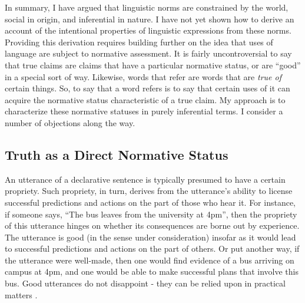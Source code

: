 In summary, I have argued that linguistic norms are constrained by the world, social in origin, and inferential in nature. I have not yet shown how to derive an account of the intentional properties of linguistic expressions from these norms. Providing this derivation requires building further on the idea that uses of language are subject to normative assessment. It is fairly uncontroversial to say that true claims are claims that have a particular normative status, or are ``good'' in a special sort of way. Likewise, words that refer are words that are \textit{true of} certain things. So, to say that a word refers is to say that certain uses of it can acquire the normative status characteristic of a true claim. My approach is to characterize these normative statuses in purely inferential terms. I consider a number of objections along the way. 
 
\subsection{Truth as a Direct Normative Status}

An utterance of a declarative sentence is typically presumed to have a certain propriety. Such propriety, in turn, derives from the utterance's ability to license successful predictions and actions on the part of those who hear it. For instance, if someone says, ``The bus leaves from the university at 4pm'', then the propriety of this utterance hinges on whether its consequences are borne out by experience. The utterance is good (in the sense under consideration) insofar as it would lead to successful predictions and actions on the part of others. Or put another way, if the utterance were well-made, then one would find evidence of a bus arriving on campus at 4pm, and one would be able to make successful plans that involve this bus. Good utterances do not disappoint - they can be relied upon in practical matters \citep{Misak:2007}. 

